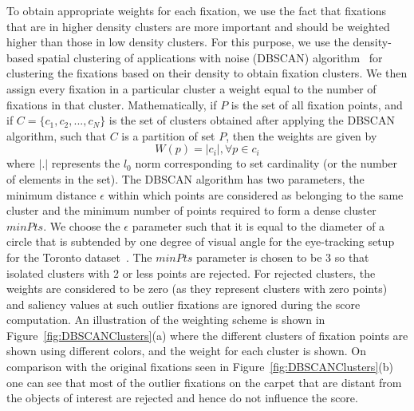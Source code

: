 \documentclass[12pt,onecolumn,journal,	draftclsnofoot]{IEEEtran}
\begin{document}
 To obtain appropriate weights for each fixation, we use the fact that fixations that are in higher density clusters are more important and should be weighted higher than those in low density clusters. For this purpose, we use the density-based spatial clustering of applications with noise (DBSCAN) algorithm~\cite{DBSCAN} for clustering the fixations based on their density to obtain fixation clusters. We then assign every fixation in a particular cluster a weight equal to the number of fixations in that cluster. Mathematically, if $P$ is the set of all fixation points, and if $C = \{c_1,c_2,...,c_N\}$ is the set of clusters obtained after applying the DBSCAN algorithm, such that $C$ is a partition of set $P$, then the weights are given by
 \begin{equation}
   W(p) = |c_i|, \forall p \in c_i 
 \end{equation} 
 where $|.|$ represents the $l_0$ norm corresponding to set cardinality (or the number of elements in the set).  
 The DBSCAN algorithm has two parameters, the minimum distance $\epsilon$ within which points are considered as belonging to the same cluster and the minimum number of points required to form a dense cluster $minPts$. We choose the $\epsilon$ parameter such that it is equal to the diameter of a circle that is subtended by one degree of visual angle for the eye-tracking setup for the Toronto dataset~\cite{AIM,VisualAngleDatabases}.  The $minPts$ parameter is chosen to be 3 so that isolated clusters with 2 or less points are rejected.  For rejected clusters, the weights are considered to be zero (as they represent clusters with zero points) and saliency values at such outlier fixations are ignored during the score computation. 
 An illustration of the weighting scheme is shown in Figure~\ref{fig:DBSCANClusters}(a)  where the different clusters of fixation points are shown using different colors, and the weight for each cluster is shown.  On comparison with the original fixations seen in Figure~\ref{fig:DBSCANClusters}(b) one can see that most of the outlier fixations on the carpet that are distant from the objects of interest are rejected and hence do not influence the score. 
 
\end{document}
